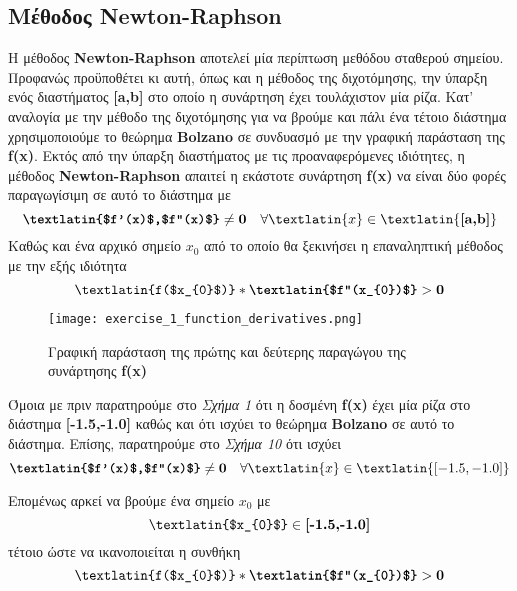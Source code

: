 \documentclass[First Project.tex]{subfiles}
\begin{document}
\subsection{ Μέθοδος \textlatin{Newton-Raphson} }
Η μέθοδος \textlatin{\textbf{Newton-Raphson}} αποτελεί μία περίπτωση μεθόδου σταθερού σημείου. Προφανώς προϋποθέτει κι αυτή, όπως και η μέθοδος της 
διχοτόμησης, την ύπαρξη ενός διαστήματος \textlatin{\textbf{[a,b]}} στο οποίο η συνάρτηση έχει τουλάχιστον μία ρίζα. Κατ' αναλογία με την μέθοδο της διχοτόμησης
για να βρούμε και πάλι ένα τέτοιο διάστημα χρησιμοποιούμε το θεώρημα \textlatin{\textbf{Bolzano}} σε συνδυασμό με την γραφική παράσταση της 
\textlatin{\textbf{f(x)}}. Εκτός από την ύπαρξη διαστήματος με τις προαναφερόμενες ιδιότητες, η μέθοδος \textlatin{\textbf{Newton-Raphson}} απαιτεί η
εκάστοτε συνάρτηση \textlatin{\textbf{f(x)}} να είναι δύο φορές παραγωγίσιμη σε αυτό το διάστημα με 
\begin{equation*}
    \textbf{\textlatin{$f'(x)$,$f''(x)$}} \neq \textbf{0} \quad \forall \textlatin{x} \in \textlatin{\textbf{[a,b]}}   
\end{equation*}
Καθώς και ένα αρχικό σημείο \textbf{\textlatin{$x_{0}$}} από το οποίο θα ξεκινήσει η επαναληπτική μέθοδος με την εξής ιδιότητα
\begin{equation*}
    \textlatin{f($x_{0}$)} * \textbf{\textlatin{$f''(x_{0})$}} > \textbf{0}
\end{equation*}
\begin{figure}[h!]
    \centering
    \captionsetup{justification=centering}
    \begin{center}
        \texttt{[image: exercise\_1\_function\_derivatives.png]}    
        \caption{Γραφική παράσταση της πρώτης και δεύτερης παραγώγου της συνάρτησης \textlatin{\textbf{f(x)}}}
    \end{center}
\end{figure}

Όμοια με πριν παρατηρούμε στο \textit{Σχήμα 1} ότι η δοσμένη \textlatin{\textbf{f(x)}} έχει μία ρίζα στο διάστημα \textlatin{\textbf{[-1.5,-1.0]}} 
καθώς και ότι ισχύει το θεώρημα \textlatin{\textbf{Bolzano}} σε αυτό το διάστημα. Επίσης, παρατηρούμε στο \textit{Σχήμα 10} ότι ισχύει 
\begin{equation*}
    \textbf{\textlatin{$f'(x)$,$f''(x)$}} \neq \textbf{0} \quad \forall \textlatin{x} \in \textlatin{[-1.5,-1.0]}
\end{equation*}

\newpage
Επομένως αρκεί να βρούμε ένα σημείο \textlatin{\textbf{$x_{0}$}} με
\begin{equation*}
    \textlatin{$x_{0}$} \in \textbf{[-1.5,-1.0]}
\end{equation*}
τέτοιο ώστε να ικανοποιείται η συνθήκη
\begin{equation*}
    \textlatin{f($x_{0}$)} * \textbf{\textlatin{$f''(x_{0})$}} > \textbf{0}
\end{equation*}
 
\end{document}
